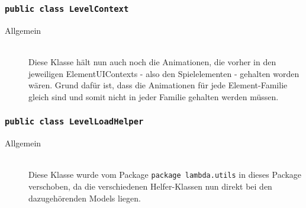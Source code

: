 \subsubsection{\normalfont \texttt{public class \textbf{LevelContext}}}

\begin{description}

\item[Allgemein] \hfill \\ Diese Klasse hält nun auch noch die Animationen, die vorher in den jeweiligen ElementUIContexts - also den Spielelementen - gehalten worden wären. Grund dafür ist, dass die Animationen für jede Element-Familie gleich sind und somit nicht in jeder Familie gehalten werden müssen.
\end{description}
\subsubsection{\normalfont \texttt{public class \textbf{LevelLoadHelper}}}
\begin{description}
\item[Allgemein] \hfill \\ Diese Klasse wurde vom Package \texttt{package lambda.utils} in dieses Package verschoben, da die verschiedenen Helfer-Klassen nun direkt bei den dazugehörenden Models liegen.
\end{description}